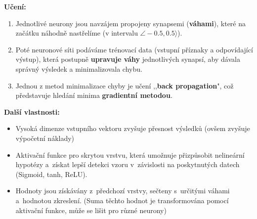 \textbf{Učení:}
\begin{enumerate}
    \item Jednotlivé neurony jsou navzájem propojeny synapsemi (\textbf{váhami}), které na začátku náhodně nastřelíme (v intervalu $\angle -0.5, 0.5 \rangle$).
    \item Poté neuronové síti podáváme trénovací data (vstupní příznaky a odpovídající výstup), která postupně \textbf{upravuje váhy} jednotlivých synapsí, aby dávala správný výsledek a minimalizovala chybu.
    \item Jednou z metod minimalizace chyby je učení ,,\textbf{back propagation}", což představuje hledání minima \textbf{gradientní metodou}.
\end{enumerate}

\textbf{Další vlastnosti:}
\begin{itemize}
    \item Vysoká dimenze vstupního vektoru zvyšuje přesnost výsledků (ovšem zvyšuje výpočetní náklady)
    \item Aktivační funkce pro skrytou vrstvu, která umožnuje přizpůsobit nelineární hypotézy a~získat lepší detekci vzoru v~závislosti na poskytnutých datech (Sigmoid, tanh, ReLU).
    \item Hodnoty jsou získávány z~předchozí vrstvy, sečteny s~určitými váhami a~hodnotou zkreslení. (Suma těchto hodnot je transformována pomocí aktivační funkce, může se lišit pro různé neurony)
\end{itemize}

